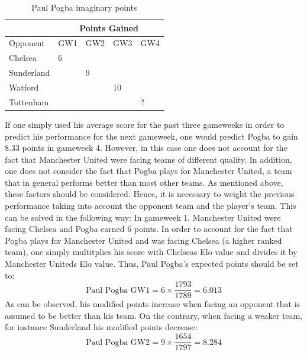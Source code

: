 \begin{table}[H]
\centering
\caption{Paul Pogba imaginary points}
\label{my-label}
\begin{tabular}{|l|l|l|l|l|}
\hline
\multicolumn{1}{|c|}{} & \multicolumn{4}{c|}{Points Gained} \\ \hline
Opponent               & GW1        & GW2       & GW3    & GW4   \\
\hline
Chelsea                & 6          &           &        &       \\
Sunderland             &            & 9         &        &       \\
Watford                &            &           & 10     &         \\
Tottenham              &            &           &        & ?      \\
\hline
\end{tabular}
\end{table}

If one simply used his average score for the past three gameweeks in order to predict his performance for the next gameweek, one would predict Pogba to gain 8.33 points in gameweek 4. However, in this case one does not account for the fact that Manchester United were facing teams of different quality. In addition, one does not consider the fact that Pogba plays for Manchester United, a team that in general performs better than most other teams. As mentioned above, these factors should be considered. Hence, it is necessary to weight the previous performance taking into account the opponent team and the player's team. This can be solved in the following way: 
\newpar
In gameweek 1, Manchester United were facing Chelsea and Pogba earned 6 points. In order to account for the fact that Pogba plays for Manchester United and was facing Chelsea (a higher ranked team), one simply multitplies his score with Chelseas Elo value and divides it by Manchester Uniteds Elo value. Thus, Paul Pogba's expected points should be set to:
\begin{equation*}
    \textrm{Paul Pogba GW1} = 6 \times \frac{1793}{1789} = 6.013 
\end{equation*}
As can be observed, his modified points increase when facing an opponent that is assumed to be better than his team. On the contrary, when facing a weaker team, for instance Sunderland his modified points decrease: 
\begin{equation*}
    \textrm{Paul Pogba GW2} = 9 \times \frac{1654}{1797} = 8.284 
\end{equation*}

